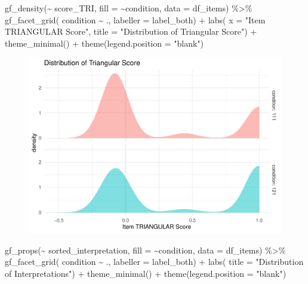 \documentclass[
  letterpaper,
  DIV=11,
  numbers=noendperiod]{scrreprt}
\newenvironment{Shaded}{\begin{snugshade}}{\end{snugshade}}
\newcommand{\AttributeTok}[1]{\textcolor[rgb]{0.40,0.45,0.13}{#1}}
\newcommand{\FunctionTok}[1]{\textcolor[rgb]{0.28,0.35,0.67}{#1}}
\newcommand{\NormalTok}[1]{\textcolor[rgb]{0.00,0.23,0.31}{#1}}
\newcommand{\SpecialCharTok}[1]{\textcolor[rgb]{0.37,0.37,0.37}{#1}}
\newcommand{\StringTok}[1]{\textcolor[rgb]{0.13,0.47,0.30}{#1}}
\begin{document}
\begin{Shaded}
\begin{Highlighting}[]
\FunctionTok{gf\_density}\NormalTok{(}\SpecialCharTok{\textasciitilde{}}\NormalTok{ score\_TRI, }\AttributeTok{fill =} \SpecialCharTok{\textasciitilde{}}\NormalTok{condition, }\AttributeTok{data =}\NormalTok{ df\_items) }\SpecialCharTok{\%\textgreater{}\%} 
  \FunctionTok{gf\_facet\_grid}\NormalTok{( condition }\SpecialCharTok{\textasciitilde{}}\NormalTok{ ., }\AttributeTok{labeller =}\NormalTok{ label\_both) }\SpecialCharTok{+} 
  \FunctionTok{labs}\NormalTok{( }\AttributeTok{x =} \StringTok{"Item TRIANGULAR Score"}\NormalTok{, }\AttributeTok{title =} \StringTok{"Distribution of Triangular Score"}\NormalTok{) }\SpecialCharTok{+} \FunctionTok{theme\_minimal}\NormalTok{() }\SpecialCharTok{+} \FunctionTok{theme}\NormalTok{(}\AttributeTok{legend.position =} \StringTok{"blank"}\NormalTok{)}
\end{Highlighting}
\end{Shaded}

\begin{figure}[H]

{\centering \includegraphics{analysis/SGC3A/2_sgc3A_scoring_files/figure-pdf/unnamed-chunk-81-2.pdf}

}

\end{figure}

\begin{Shaded}
\begin{Highlighting}[]
\FunctionTok{gf\_props}\NormalTok{(}\SpecialCharTok{\textasciitilde{}}\NormalTok{ sorted\_interpretation, }\AttributeTok{fill =} \SpecialCharTok{\textasciitilde{}}\NormalTok{condition, }\AttributeTok{data =}\NormalTok{ df\_items) }\SpecialCharTok{\%\textgreater{}\%} 
  \FunctionTok{gf\_facet\_grid}\NormalTok{( condition }\SpecialCharTok{\textasciitilde{}}\NormalTok{ ., }\AttributeTok{labeller =}\NormalTok{ label\_both) }\SpecialCharTok{+} 
  \FunctionTok{labs}\NormalTok{( }\AttributeTok{title =} \StringTok{"Distribution of Interpretations"}\NormalTok{) }\SpecialCharTok{+} \FunctionTok{theme\_minimal}\NormalTok{() }\SpecialCharTok{+} \FunctionTok{theme}\NormalTok{(}\AttributeTok{legend.position =} \StringTok{"blank"}\NormalTok{)}
\end{Highlighting}
\end{Shaded}
\end{document}
